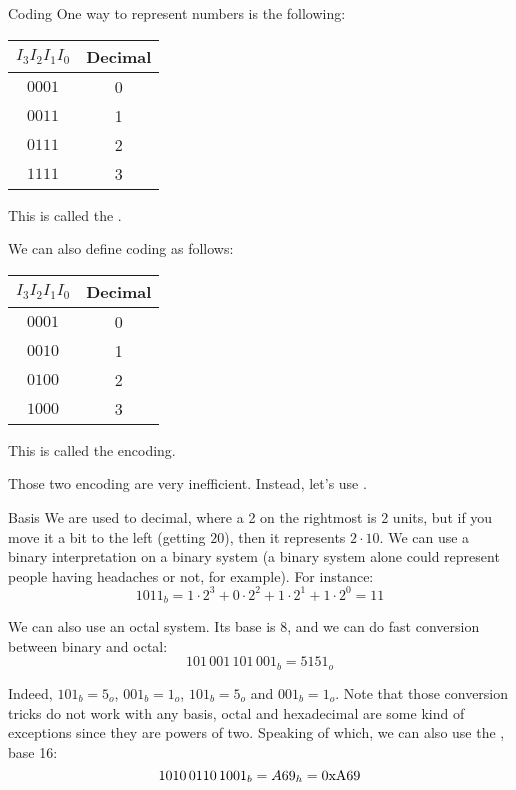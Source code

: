 \documentclass[a4paper]{article}
\begin{document}
\begin{parag}{Coding}
    One way to represent numbers is the following:
    \begin{center}
    \begin{tabular}{c|c}
        $I_3I_2I_1I_0$ & Decimal \\
        \hline
        $0001$ & 0 \\
        $0011$ & 1 \\
        $0111$ & 2 \\
        $1111$ & 3
    \end{tabular}
    \end{center}
    
    This is called the .

    We can also define coding as follows:
    \begin{center}
    \begin{tabular}{c|c}
        $I_3I_2I_1I_0$ & Decimal \\
        \hline
        $0001$ & 0 \\
        $0010$ & 1 \\
        $0100$ & 2 \\
        $1000$ & 3
    \end{tabular}
    \end{center}

    This is called the  encoding.

    Those two encoding are very inefficient. Instead, let's use .
\end{parag}

\begin{parag}{Basis}
     We are used to decimal, where a 2 on the rightmost is 2 units, but if you move it a bit to the left (getting $20$), then it represents $2\cdot 10$. We can use a binary interpretation on a binary system (a binary system alone could represent people having headaches or not, for example). For instance: 
    \[1011_b = 1\cdot 2^3 + 0\cdot 2^2 + 1\cdot 2^1 + 1\cdot 2^0 = 11\]
    
    We can also use an octal system. Its base is 8, and we can do fast conversion between binary and octal: 
    \[101\,001\,101\,001_b = 5151_o\]

    Indeed, $101_b = 5_o$, $001_b = 1_o$, $101_b = 5_o$ and $001_b = 1_o$. Note that those conversion tricks do not work with any basis, octal and hexadecimal are some kind of exceptions since they are powers of two. Speaking of which, we can also use the , base 16: 
    \[1010\,0110\,1001_b = A69_h = \text{0xA69}\]

\end{parag}
\end{document}
